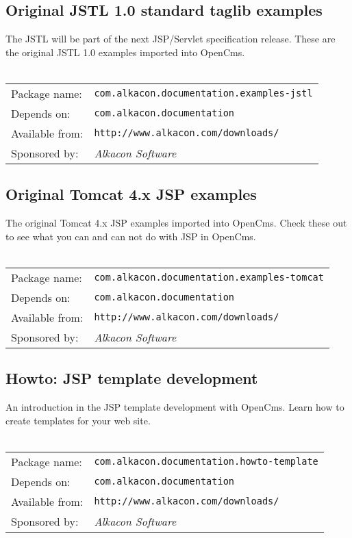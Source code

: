 \subsection{Original JSTL 1.0 standard taglib examples}
The JSTL will be part of the next JSP/Servlet specification release. These are the original 
JSTL 1.0 examples imported into OpenCms.
\\
\\
\begin{tabular}{ll}
Package name: & {\tt com.alkacon.documentation.examples-jstl}\\
Depends on: & {\tt com.alkacon.documentation}\\
Available from: & {\tt http://www.alkacon.com/downloads/}\\
Sponsored by: & {\em Alkacon Software}\\
\end{tabular}

\subsection{Original Tomcat 4.x JSP examples}
The original Tomcat 4.x JSP examples imported into OpenCms. Check these out to see what you can 
and can not do with JSP in OpenCms.
\\
\\
\begin{tabular}{ll}
Package name: & {\tt com.alkacon.documentation.examples-tomcat}\\
Depends on: & {\tt com.alkacon.documentation}\\
Available from: & {\tt http://www.alkacon.com/downloads/}\\
Sponsored by: & {\em Alkacon Software}\\
\end{tabular}

\subsection{Howto: JSP template development}
An introduction in the JSP template development with OpenCms. Learn how to create templates 
for your web site.
\\
\\
\begin{tabular}{ll}
Package name: & {\tt com.alkacon.documentation.howto-template}\\
Depends on: & {\tt com.alkacon.documentation}\\
Available from: & {\tt http://www.alkacon.com/downloads/}\\
Sponsored by: & {\em Alkacon Software}\\
\end{tabular}

